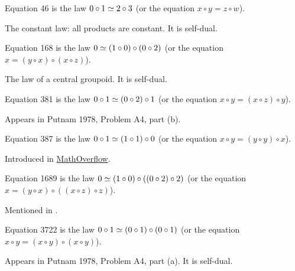 \begin{definition}[Equation 46]\label{eq46}\leanok{}  Equation 46 is the law $0 \circ 1  \simeq  2 \circ 3$ (or the equation $x \circ y = z \circ w$).
\end{definition}

The constant law: all products are constant. It is self-dual.

\begin{definition}[Equation 168]\label{eq168}\leanok{}  Equation 168 is the law $0  \simeq  (1 \circ 0) \circ (0 \circ 2)$ (or the equation $x = (y \circ x) \circ (x \circ z)$).
\end{definition}

The law of a central groupoid. It is self-dual.

\begin{definition}[Equation 381]\label{eq381}\leanok{}  Equation 381 is the law $0 \circ 1  \simeq  (0 \circ 2) \circ 1$ (or the equation $x \circ y = (x \circ z) \circ y$).
\end{definition}

Appears in Putnam 1978, Problem A4, part (b).

\begin{definition}[Equation 387]\label{eq387}\leanok{}  Equation 387 is the law $0 \circ 1  \simeq  (1 \circ 1) \circ 0$ (or the equation $x \circ y = (y \circ y) \circ x$).
\end{definition}

Introduced in \href{https://mathoverflow.net/a/450905/766}{MathOverflow}.

\begin{definition}[Equation 1689]\label{eq1689}\leanok{}  Equation 1689 is the law $0 \simeq  (1 \circ 0) \circ ((0 \circ 2) \circ 2)$ (or the equation $x = (y \circ x) \circ ((x \circ z) \circ z)$).
\end{definition}

Mentioned in \cite{Kisielewicz2}.

\begin{definition}[Equation 3722]\label{eq3722}\leanok{}  Equation 3722 is the law $0 \circ 1  \simeq  (0 \circ 1) \circ (0 \circ 1)$ (or the equation $x \circ y = (x \circ y) \circ (x \circ y)$).
\end{definition}

Appears in Putnam 1978, Problem A4, part (a).  It is self-dual.


